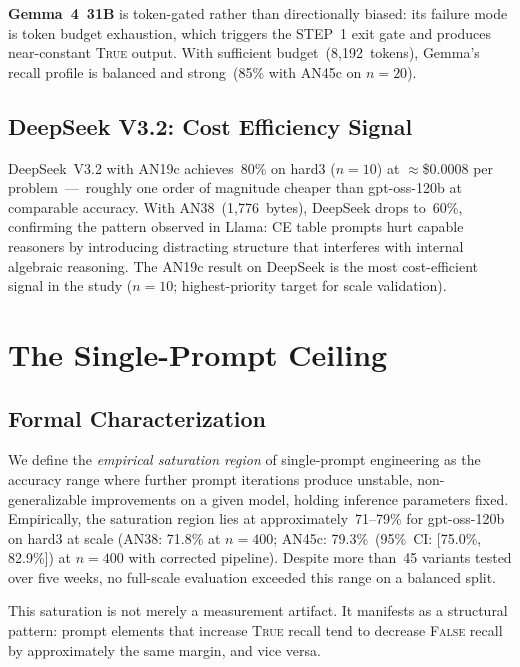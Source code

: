 \documentclass[11pt]{article}
\begin{document}
\textbf{Gemma~4~31B} is token-gated rather than directionally biased:
its failure mode is token budget exhaustion, which triggers the STEP~1
exit gate and produces near-constant \textsc{True} output. With
sufficient budget~(8{,}192~tokens), Gemma's recall profile is balanced
and strong~(85\% with AN45c on $n=20$).

\subsection{DeepSeek V3.2: Cost Efficiency Signal}

DeepSeek~V3.2 with AN19c achieves~80\% on hard3 ($n=10$) at
$\approx$\$0.0008 per problem~---~roughly one order of magnitude cheaper
than gpt-oss-120b at comparable accuracy. With AN38~(1{,}776~bytes),
DeepSeek drops to~60\%, confirming the pattern observed in Llama: CE
table prompts hurt capable reasoners by introducing distracting
structure that interferes with internal algebraic reasoning. The AN19c
result on DeepSeek is the most cost-efficient signal in the study
($n=10$; highest-priority target for scale validation).

\section{The Single-Prompt Ceiling}
\label{sec:ceiling}

\subsection{Formal Characterization}

We define the \emph{empirical saturation region} of single-prompt
engineering as the accuracy range where further prompt iterations produce
unstable, non-generalizable improvements on a given model, holding
inference parameters fixed. Empirically, the saturation region lies at
approximately~71--79\% for gpt-oss-120b on hard3 at scale
(AN38: 71.8\% at $n=400$; AN45c: 79.3\%~(95\%~CI: [75.0\%, 82.9\%])
at $n=400$ with corrected pipeline). Despite more than~45 variants
tested over five weeks, no full-scale evaluation exceeded this range
on a balanced split.

This saturation is not merely a measurement artifact. It manifests as a
structural pattern: prompt elements that increase \textsc{True} recall
tend to decrease \textsc{False} recall by approximately the same margin,
and vice versa.
\end{document}
